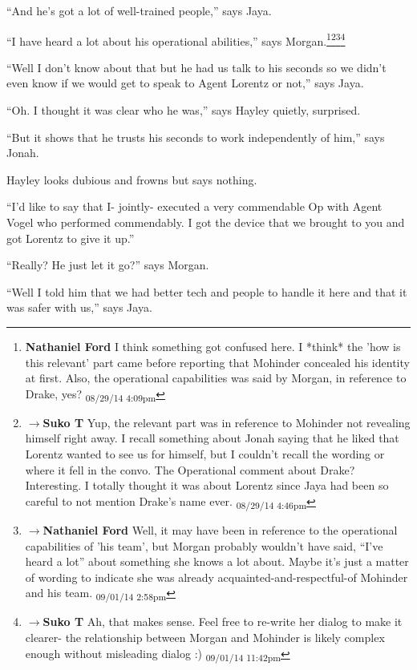 ``And he's got a lot of well-trained people,'' says Jaya.

``I have heard a lot about his operational abilities,'' says Morgan.\footnote{\textbf{Nathaniel Ford }I think something got confused here. I *think* the 'how is this relevant' part came before reporting that Mohinder concealed his identity at first. Also, the operational capabilities was said by Morgan, in reference to Drake, yes? \textsubscript{08/29/14 4:09pm}}\footnote{$\rightarrow$\textbf{Suko T }Yup, the relevant part was in reference to Mohinder not revealing himself right away.  I recall something about Jonah saying that he liked that Lorentz wanted to see us for himself, but I couldn't recall the wording or where it fell in the convo.  The Operational comment about Drake?   Interesting.  I totally thought it was about Lorentz since Jaya had been so careful to not mention Drake's name ever. \textsubscript{08/29/14 4:46pm}}\footnote{$\rightarrow$\textbf{Nathaniel Ford }Well, it may have been in reference to the operational capabilities of 'his team', but Morgan probably wouldn't have said, ``I've heard a lot'' about something she knows a lot about. Maybe it's just a matter of wording to indicate she was already acquainted-and-respectful-of Mohinder and his team. \textsubscript{09/01/14 2:58pm}}\footnote{$\rightarrow$\textbf{Suko T }Ah, that makes sense.  Feel free to re-write her dialog to make it clearer- the relationship between Morgan and Mohinder is likely complex enough without misleading dialog :) \textsubscript{09/01/14 11:42pm}}

``Well I don't know about that but he had us talk to his seconds so we didn't even know if we would get to speak to Agent Lorentz or not,'' says Jaya.

``Oh.  I thought it was clear who he was,'' says Hayley quietly, surprised.

``But it shows that he trusts his seconds to work independently of him,'' says Jonah.

Hayley looks dubious and frowns but says nothing.

``I'd like to say that I- jointly- executed a very commendable Op with Agent Vogel who performed commendably.  I got the device that we brought to you and got Lorentz to give it up.''

``Really?  He just let it go?'' says Morgan.

``Well I told him that we had better tech and people to handle it here and that it was safer with us,'' says Jaya.

